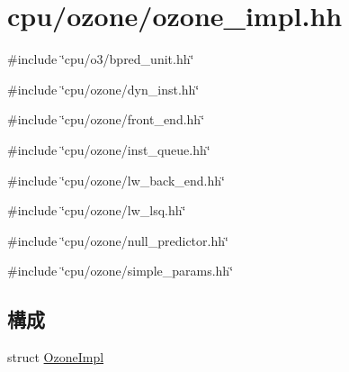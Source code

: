 \hypertarget{ozone__impl_8hh}{
\section{cpu/ozone/ozone\_\-impl.hh}
\label{ozone__impl_8hh}
}
{\ttfamily \#include \char`\"{}cpu/o3/bpred\_\-unit.hh\char`\"{}}\par
{\ttfamily \#include \char`\"{}cpu/ozone/dyn\_\-inst.hh\char`\"{}}\par
{\ttfamily \#include \char`\"{}cpu/ozone/front\_\-end.hh\char`\"{}}\par
{\ttfamily \#include \char`\"{}cpu/ozone/inst\_\-queue.hh\char`\"{}}\par
{\ttfamily \#include \char`\"{}cpu/ozone/lw\_\-back\_\-end.hh\char`\"{}}\par
{\ttfamily \#include \char`\"{}cpu/ozone/lw\_\-lsq.hh\char`\"{}}\par
{\ttfamily \#include \char`\"{}cpu/ozone/null\_\-predictor.hh\char`\"{}}\par
{\ttfamily \#include \char`\"{}cpu/ozone/simple\_\-params.hh\char`\"{}}\par
\subsection*{構成}
\begin{DoxyCompactItemize}
\item 
struct \hyperlink{structOzoneImpl}{OzoneImpl}
\end{DoxyCompactItemize}
